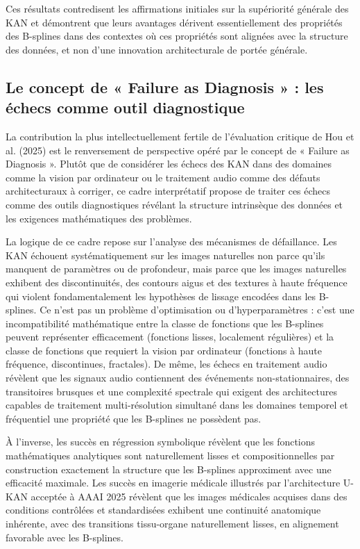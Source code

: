 \documentclass[11pt,a4paper,oneside]{report}
\theoremstyle{definition}
\theoremstyle{remark}
\begin{document}
Ces résultats contredisent les affirmations initiales sur la supériorité générale des KAN et démontrent que leurs avantages dérivent essentiellement des propriétés des B-splines dans des contextes où ces propriétés sont alignées avec la structure des données, et non d'une innovation architecturale de portée générale.

\subsection{Le concept de « Failure as Diagnosis » : les échecs comme outil diagnostique}

La contribution la plus intellectuellement fertile de l'évaluation critique de Hou et al. (2025) est le renversement de perspective opéré par le concept de « Failure as Diagnosis ». Plutôt que de considérer les échecs des KAN dans des domaines comme la vision par ordinateur ou le traitement audio comme des défauts architecturaux à corriger, ce cadre interprétatif propose de traiter ces échecs comme des outils diagnostiques révélant la structure intrinsèque des données et les exigences mathématiques des problèmes.

La logique de ce cadre repose sur l'analyse des mécanismes de défaillance. Les KAN échouent systématiquement sur les images naturelles non parce qu'ils manquent de paramètres ou de profondeur, mais parce que les images naturelles exhibent des discontinuités, des contours aigus et des textures à haute fréquence qui violent fondamentalement les hypothèses de lissage encodées dans les B-splines. Ce n'est pas un problème d'optimisation ou d'hyperparamètres : c'est une incompatibilité mathématique entre la classe de fonctions que les B-splines peuvent représenter efficacement (fonctions lisses, localement régulières) et la classe de fonctions que requiert la vision par ordinateur (fonctions à haute fréquence, discontinues, fractales). De même, les échecs en traitement audio révèlent que les signaux audio contiennent des événements non-stationnaires, des transitoires brusques et une complexité spectrale qui exigent des architectures capables de traitement multi-résolution simultané dans les domaines temporel et fréquentiel  une propriété que les B-splines ne possèdent pas.

À l'inverse, les succès en régression symbolique révèlent que les fonctions mathématiques analytiques sont naturellement lisses et compositionnelles par construction  exactement la structure que les B-splines approximent avec une efficacité maximale. Les succès en imagerie médicale  illustrés par l'architecture U-KAN acceptée à AAAI 2025  révèlent que les images médicales acquises dans des conditions contrôlées et standardisées exhibent une continuité anatomique inhérente, avec des transitions tissu-organe naturellement lisses, en alignement favorable avec les B-splines.
\end{document}
